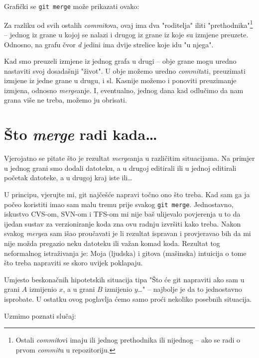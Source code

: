 Grafički se \verb+git merge+ može prikazati ovako:



Za razliku od svih ostalih \emph{commit}ova, ovaj ima dva "roditelja" iliti "prethodnika"\footnote{Ostali \emph{commit}ovi imaju ili jednog prethodnika ili nijednog -- ako se radi o prvom \emph{commit}u u repozitoriju.} -- jednog iz grane u kojoj se nalazi i drugog iz grane iz koje su izmjene preuzete.
Odnosno, na grafu čvor \emph d jedini ima dvije strelice koje idu "u njega".

Kad smo preuzeli izmjene iz jednog grafa u drugi -- obje grane mogu uredno nastaviti svoj dosadašnji "život".
U obje možemo uredno \emph{commit}ati, preuzimati izmjene iz jedne grane u drugu, i sl.
Kasnije možemo i ponoviti preuzimanje izmjena, odnosno \emph{merge}anje.
I, eventualno, jednog dana kad odlučimo da nam grana više ne treba, možemo ju obrisati.

\section*{Što \emph{merge} radi kada\dots}

Vjerojatno se pitate što je rezultat \emph{merge}anja u različitim situacijama.
Na primjer u jednog grani smo dodali datoteku, a u drugoj editirali ili u jednoj editirali početak datoteke, a u drugoj kraj iste ili\dots

U principu, vjerujte mi, git najčešće napravi točno ono što treba. 
Kad sam ga ja počeo koristiti imao sam malu tremu prije svakog \verb+git merge+.
Jednostavno, iskustvo CVS-om, SVN-om i TFS-om mi nije baš ulijevalo povjerenja u to da ijedan sustav za verzioniranje koda zna ovu radnju izvršiti kako treba.
Nakon svakog \emph{merge}a sam išao proučavati je li rezultat ispravan i provjeravao bih da mi nije možda pregazio neku datoteku ili važan komad koda.
Rezultat tog neformalnog istraživanja je: Moja (ljudska) i gitova (mašinska) intuicija o tome što treba napraviti se skoro uvijek poklapaju.

Umjesto beskonačnih hipotetskih situacija tipa "Što će git napraviti ako sam u grani $A$ izmijenio $x$, a u grani $B$ izmijenio $y$\dots" -- najbolje je da to jednostavno isprobate. 
U ostatku ovog poglavlja ćemo samo proći nekoliko posebnih situacija.

Uzmimo poznati slučaj:




